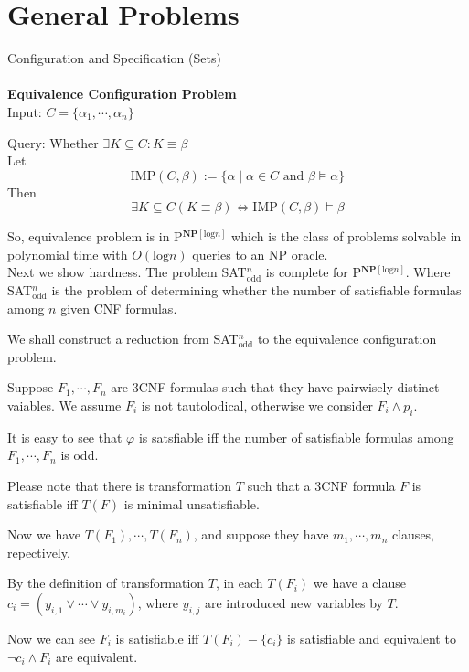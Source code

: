\documentclass[12pt]{article}
\begin{document}
\section{General Problems}


Configuration and Specification (Sets)\\ \ \\

{\bf Equivalence Configuration Problem}\\

Input: $C=\{\alpha_1,\cdots,\alpha_n\}$

Query: Whether $\exists K\subseteq C: K\equiv \beta$\\

Let
$$\mbox{IMP}(C,\beta):=\{\alpha\mid \alpha\in C \mbox{ and }\beta\models \alpha\}$$
Then
$$\exists K\subseteq  C(K\equiv \beta)\Longleftrightarrow\mbox{IMP}(C,\beta)\models \beta$$

So, equivalence problem is in P$^{\textbf{NP}[\text{log} n]}$ which is the class of problems solvable in polynomial time with $O(\text{log}n)$ queries to an NP oracle.\\

Next we show hardness. The problem SAT$^n_{\text{odd}}$ is complete for P$^{\textbf{NP}[\text{log} n]}$. Where SAT$^n_{\text{odd}}$ is the problem of determining whether the number of satisfiable formulas among $n$ given CNF formulas.

We shall construct a reduction from SAT$^n_{\text{odd}}$ to the equivalence configuration problem. 

Suppose $F_1,\cdots, F_n$ are 3CNF formulas such that they have pairwisely distinct vaiables. We assume $F_i$ is not tautolodical, otherwise we consider $F_i\wedge p_i$. 
 
 
It is easy to see that $\varphi$ is satsfiable iff the number of satisfiable formulas among $F_1,\cdots, F_n$ is odd.  


Please note that there is transformation $T$ such that a 3CNF formula $F$ is satisfiable iff $T(F)$ is minimal unsatisfiable. 

Now we have $T(F_1),\cdots, T(F_n)$, and suppose they have $m_1,\cdots, m_n$ clauses, repectively.

By the definition of transformation $T$, in each $T(F_i)$ we have a clause $c_i=(y_{i,1}\vee \cdots\vee y_{i,m_i})$, where $y_{i,j}$ are introduced new variables by $T$.

Now we can see $F_i$ is satisfiable iff $T(F_i)-\{c_i\}$ is satisfiable and equivalent to $\neg c_i\wedge F_i$ are equivalent.
\end{document}
